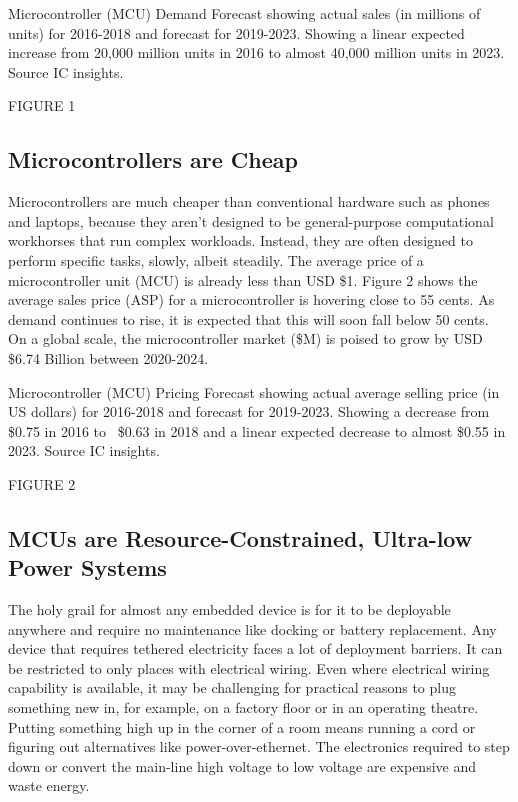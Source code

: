 

Microcontroller (MCU) Demand Forecast showing actual sales (in millions of units) for 2016-2018 and forecast for 2019-2023. Showing a linear expected increase from 20,000 million units in 2016 to almost 40,000 million units in 2023. Source IC insights.

FIGURE 1

\subsection{Microcontrollers are Cheap}


Microcontrollers are much cheaper than conventional hardware such as phones and laptops, because they aren’t designed to be general-purpose computational workhorses that run complex workloads. Instead, they are often designed to perform specific tasks, slowly, albeit steadily. The average price of a microcontroller unit (MCU) is already less than USD \$1. Figure 2 shows the average sales price (ASP) for a microcontroller is hovering close to 55 cents. As demand continues to rise, it is expected that this will soon fall below 50 cents. On a global scale, the microcontroller market (\$M) is poised to grow by USD \$6.74 Billion between 2020-2024.




Microcontroller (MCU) Pricing Forecast showing actual average selling price (in US dollars) for 2016-2018 and forecast for 2019-2023. Showing a decrease from \$0.75 in 2016 to ~\$0.63 in 2018 and a linear expected decrease to almost \$0.55 in 2023. Source IC insights.

FIGURE 2

\subsection{MCUs are Resource-Constrained, Ultra-low Power Systems}

The holy grail for almost any embedded device is for it to be deployable anywhere and require no maintenance like docking or battery replacement. Any device that requires tethered electricity faces a lot of deployment barriers. It can be restricted to only places with electrical wiring. Even where electrical wiring capability is available, it may be challenging for practical reasons to plug something new in, for example, on a factory floor or in an operating theatre. Putting something high up in the corner of a room means running a cord or figuring out alternatives like power-over-ethernet. The electronics required to step down or convert the main-line high voltage to low voltage are expensive and waste energy.

